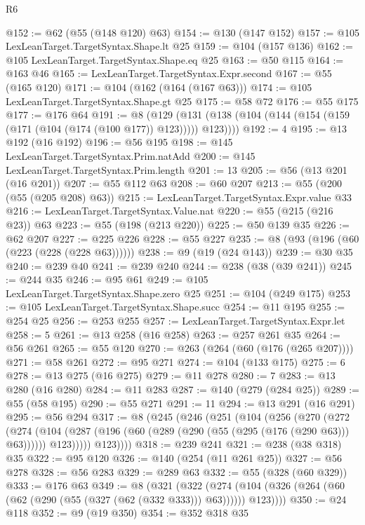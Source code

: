 \begin{lexlean}{R6}
\begin{coremodule}
@152 := @62 (@55 (@148 @120) @63)
@154 := @130 (@147 @152)
@157 := @105 LexLeanTarget.TargetSyntax.Shape.lt @25
@159 := @104 (@157 @136)
@162 := @105 LexLeanTarget.TargetSyntax.Shape.eq @25
@163 := @50 @115
@164 := @163 @46
@165 := LexLeanTarget.TargetSyntax.Expr.second
@167 := @55 (@165 @120)
@171 := @104 (@162 (@164 (@167 @63)))
@174 := @105 LexLeanTarget.TargetSyntax.Shape.gt @25
@175 := @58 @72
@176 := @55 @175
@177 := @176 @64
@191 := @8
    (@129 (@131 (@138 (@104 (@144 (@154 (@159 (@171 (@104 (@174 (@100 @177)) @123))))) @123))))
@192 := 4
@195 := @13 @192 (@16 @192)
@196 := @56 @195
@198 := @145 LexLeanTarget.TargetSyntax.Prim.natAdd
@200 := @145 LexLeanTarget.TargetSyntax.Prim.length
@201 := 13
@205 := @56 (@13 @201 (@16 @201))
@207 := @55 @112 @63
@208 := @60 @207
@213 := @55 (@200 (@55 (@205 @208) @63))
@215 := LexLeanTarget.TargetSyntax.Expr.value @33
@216 := LexLeanTarget.TargetSyntax.Value.nat
@220 := @55 (@215 (@216 @23)) @63
@223 := @55 (@198 (@213 @220))
@225 := @50 @139 @35
@226 := @62 @207
@227 := @225 @226
@228 := @55 @227
@235 := @8 (@93 (@196 (@60 (@223 (@228 (@228 @63))))))
@238 := @9 (@19 (@24 @143))
@239 := @30 @35
@240 := @239 @40
@241 := @239 @240
@244 := @238 (@38 (@39 @241))
@245 := @244 @35
@246 := @95 @61
@249 := @105 LexLeanTarget.TargetSyntax.Shape.zero @25
@251 := @104 (@249 @175)
@253 := @105 LexLeanTarget.TargetSyntax.Shape.succ
@254 := @11 @195
@255 := @254 @25
@256 := @253 @255
@257 := LexLeanTarget.TargetSyntax.Expr.let
@258 := 5
@261 := @13 @258 (@16 @258)
@263 := @257 @261 @35
@264 := @56 @261
@265 := @55 @120
@270 := @263 (@264 (@60 (@176 (@265 @207))))
@271 := @58 @261
@272 := @95 @271
@274 := @104 (@133 @175)
@275 := 6
@278 := @13 @275 (@16 @275)
@279 := @11 @278
@280 := 7
@283 := @13 @280 (@16 @280)
@284 := @11 @283
@287 := @140 (@279 (@284 @25))
@289 := @55 (@58 @195)
@290 := @55 @271
@291 := 11
@294 := @13 @291 (@16 @291)
@295 := @56 @294
@317 := @8
    (@245
      (@246
        (@251
          (@104
            (@256
              (@270
                (@272
                  (@274
                    (@104
                      (@287 (@196 (@60 (@289 (@290 (@55 (@295 (@176 (@290 @63))) @63))))))
                      @123)))))
            @123))))
@318 := @239 @241
@321 := @238 (@38 @318) @35
@322 := @95 @120
@326 := @140 (@254 (@11 @261 @25))
@327 := @56 @278
@328 := @56 @283
@329 := @289 @63
@332 := @55 (@328 (@60 @329))
@333 := @176 @63
@349 := @8
    (@321
      (@322 (@274 (@104 (@326 (@264 (@60 (@62 (@290 (@55 (@327 (@62 (@332 @333))) @63)))))) @123))))
@350 := @24 @118
@352 := @9 (@19 @350)
@354 := @352 @318 @35

\end{coremodule}
\end{lexlean}
